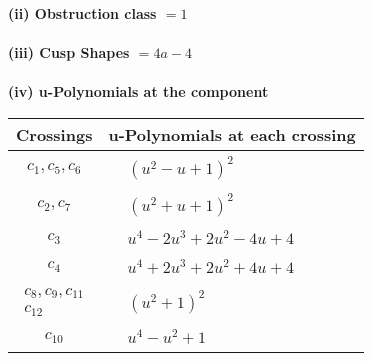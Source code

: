 \documentclass[1p]{elsarticle_modified}
\theoremstyle{definition}
\begin{document}
\flushleft \textbf{(ii) Obstruction class $= 1$}\\~\\
\flushleft \textbf{(iii) Cusp Shapes $= 4 a-4$}\\~\\
\newpage\renewcommand{\arraystretch}{1}
\flushleft \textbf{(iv) u-Polynomials at the component}\newline \\
\begin{tabular}{m{50pt}|m{274pt}}
Crossings & \hspace{64pt}u-Polynomials at each crossing \\
\hline $$\begin{aligned}c_{1},c_{5},c_{6}\end{aligned}$$&$\begin{aligned}
&(u^2- u+1)^2
\end{aligned}$\\
\hline $$\begin{aligned}c_{2},c_{7}\end{aligned}$$&$\begin{aligned}
&(u^2+u+1)^2
\end{aligned}$\\
\hline $$\begin{aligned}c_{3}\end{aligned}$$&$\begin{aligned}
&u^4-2 u^3+2 u^2-4 u+4
\end{aligned}$\\
\hline $$\begin{aligned}c_{4}\end{aligned}$$&$\begin{aligned}
&u^4+2 u^3+2 u^2+4 u+4
\end{aligned}$\\
\hline $$\begin{aligned}c_{8},c_{9},c_{11}\\c_{12}\end{aligned}$$&$\begin{aligned}
&(u^2+1)^2
\end{aligned}$\\
\hline $$\begin{aligned}c_{10}\end{aligned}$$&$\begin{aligned}
&u^4- u^2+1
\end{aligned}$\\
\hline
\end{tabular}\\~\\
\end{document}
